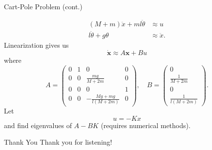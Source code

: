 \documentclass{beamer}
\newcommand{\bx}{\textbf{x}}
\newcommand{\dbx}{\dot{\bx}}
\newcommand{\ddx}{\ddot{x}}
\newcommand{\ddth}{\ddot{\theta}}
\begin{document}
\begin{frame}{Cart-Pole Problem (cont.)}

    \begin{align*}
        (M + m)\ddx + ml\ddth &\approx u \\
        l\ddth + g\theta &\approx \ddx.
    \end{align*}
    Linearization gives us
    $$\dbx \approx A\bx + Bu$$
    where $$A = 
    \begin{pmatrix}
        0 & 1 & 0 & 0 \\
        0 & 0 & \frac{mg}{M + 2m} & 0 \\
        0 & 0 & 0 & 1 \\
        0 & 0 & -\frac{Mg + mg}{l(M + 2m)} & 0
    \end{pmatrix}, \quad B = 
    \begin{pmatrix}
        0 \\
        \frac{1}{M + 2m} \\
        0 \\
        \frac{1}{l(M + 2m)}
    \end{pmatrix}.$$
    Let
    $$u = -Kx$$
    and find eigenvalues of $A - BK$ (requires numerical methods).
    
\end{frame}

\begin{frame}{Thank You}
    Thank you for listening!
\end{frame}
\end{document}

